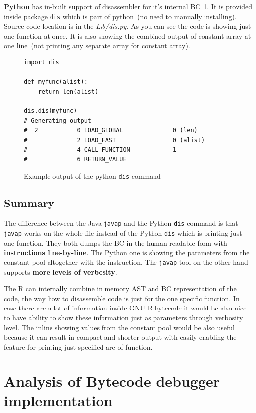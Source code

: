 \documentclass[thesis=M,english]{FITthesis}[2018/10/20]
\newcommand{\code}[1]{\texttt{#1}}
\begin{document}
\textbf{Python} has in-built support of disassembler for it's internal BC~\ref{fig:python-dis-output-example}. It is provided inside package \code{dis} which is part of python~(no need to manually installing). Source code location is in the \textit{Lib/dis.py}. As you can see the code is showing just one function at once. It is also showing the combined output of constant array at one line~(not printing any separate array for constant array).

\begin{figure}[!h]
\begin{lstlisting}
import dis

def myfunc(alist):
    return len(alist)

dis.dis(myfunc)
# Generating output
#  2           0 LOAD_GLOBAL              0 (len)
#              2 LOAD_FAST                0 (alist)
#              4 CALL_FUNCTION            1
#              6 RETURN_VALUE

\end{lstlisting}
	\caption{Example output of the python \code{dis} command}\label{fig:python-dis-output-example}
\end{figure}

\subsection{Summary}

The difference between the Java \code{javap} and the Python \code{dis} command is that \code{javap} works on the whole file instead of the Python \code{dis} which is printing just one function. They both dumps the BC in the human-readable form with \textbf{instructions line-by-line}. The Python one is showing the parameters from the constant pool altogether with the instruction. The \code{javap} tool on the other hand supports \textbf{more levels of verbosity}.

The R can internally combine in memory AST and BC representation of the code, the way how to disassemble code is just for the one specific function. In case there are a lot of information inside GNU-R bytecode it would be also nice to have ability to show these information just as parameters through verbosity level. The inline showing values from the constant pool would be also useful because it can result in compact and shorter output with easily enabling the feature for printing just specified are of function.

\section{Analysis of Bytecode debugger implementation}
\end{document}
